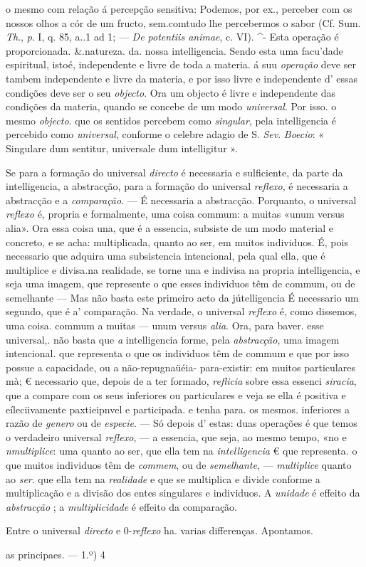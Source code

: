 o mesmo com relação á percepção sensitiva: Podemos, por ex., perceber com os nossos olhos a cór de um fructo, sem.comtudo lhe percebermos o sabor (Cf. Sum. \emph{Th}., \emph{p}. I, q. 85, a..1 ad 1; --- \emph{De potentiis animae}, c. VI). \textasciicircum{}- Esta operação é proporcionada. \&.natureza. da. nossa intelligencia. Sendo esta uma facu'dade espiritual, istoé, independente e livre de toda a materia. á suu \emph{operação} deve ser tambem independente e livre da materia, e por isso livre e independente d' essas condições deve ser o seu \emph{objecto}. Ora um objecto é livre e independente das condições da materia, quando se concebe de um modo \emph{universal}. Por isso. o mesmo \emph{objecto}. que os sentidos percebem como \emph{singular}, pela intelligencia é percebido como \emph{universal}, conforme o celebre adagio de S. \emph{Sev}. \emph{Boecio}: « Singulare dum sentitur, universale dum intelligitur ».\par Se para a formação do universal \emph{directo} é necessaria e sulficiente, da parte da intelligencia, a abstracção, para a formação do universal \emph{reflexo}, é necessaria a abstracção e a \emph{comparação}. --- É necessaria a abstracção. Porquanto, o universal \emph{reflexo} é, propria e formalmente, uma coisa commum: a muitas «unum versus alia». Ora essa coisa una, que é a essencia, subsiste de um modo material e concreto, e se acha: multiplicada, quanto ao ser, em muitos individuos. É, pois necessario que adquira uma subsistencia intencional, pela qual ella, que é multiplice e divisa.na realidade, se torne una e indivisa na propria intelligencia, e seja uma imagem, que represente o que esses individuos têm de commum, ou de semelhante --- Mas não basta este primeiro acto da jútelligencia É necessario um segundo, que é a' comparação. Na verdade, o universal \emph{reflexo} é, como dissemos, uma coisa. commum a muitas --- unum versus \emph{alia}. Ora, para baver. esse universal,. não basta que \emph{a} intelligencia forme, pela \emph{abstracção}, uma imagem intencional. que representa o que os individuos têm de commum e que por isso possue a capacidade, ou a não-repugnaüéia- para-existir: em muitos particulares mà; € necessario que, depois de a ter formado, \emph{reflicia} sobre essa essenci \emph{siracia}, que a compare com os seus inferiores ou particulares e veja se ella é positiva e eíleciivamente paxtieipnvel e participada. e tenha para. os mesmos. inferiores a razão de \emph{genero} ou de \emph{especie}. --- Só depois d' estas: duas operações é que temos o verdadeiro universal \emph{reflexo}, --- a essencia, que seja, ao mesmo tempo, «no e \emph{nmultiplice}: uma quanto ao ser, que ella tem na \emph{intelligencia} € que representa. o que muitos individuos têm de \emph{commem}, ou de \emph{semelhante}, --- \emph{multiplice} quanto ao \emph{ser}. que ella tem na \emph{realidade} e que se multiplica e divide conforme a multiplicação e a divisão dos entes singulares e individuos. A \emph{unidade} \textbar{} é \textbar{} effeito da \emph{abstracção} ; a \emph{multiplicidade} é effeito da comparação.\par Entre o universal \emph{directo} e 0-\emph{reflexo} ha. varias differenças. Apontamos.\par as principaes. --- 1.º) 4 
